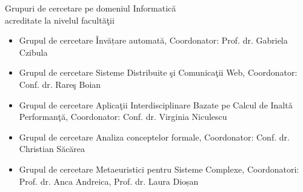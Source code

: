 \documentclass[aspectratio=169]{beamer}
\begin{document}
\begin{frame}{Grupuri de cercetare pe domeniul Informatică\\ acreditate la nivelul facultăţii}
\begin{itemize}
    \item Grupul de cercetare Învățare automată, Coordonator: Prof. dr. Gabriela Czibula
    \item Grupul de cercetare Sisteme Distribuite şi Comunicaţii Web, Coordonator: Conf. dr. Rareş Boian
    \item Grupul de cercetare Aplicaţii Interdisciplinare Bazate pe Calcul de Inaltă Performanţă, Coordonator: Conf. dr. Virginia Niculescu
    \item Grupul de cercetare Analiza conceptelor formale, Coordonator: Conf. dr. Christian Săcărea
    \item Grupul de cercetare Metaeuristici pentru Sisteme Complexe, Coordonatori: Prof. dr. Anca Andreica, Prof. dr. Laura Dioșan


\end{itemize}
\end{frame}



\end{document}
